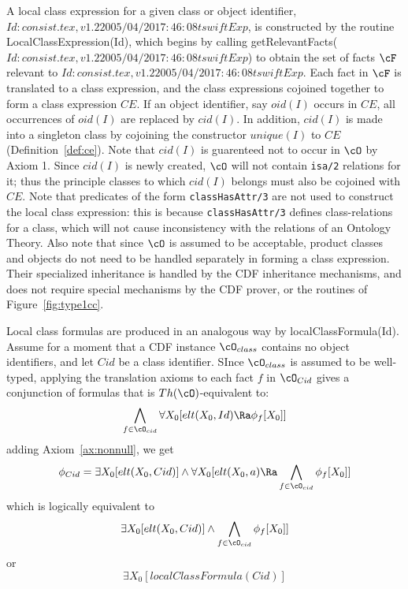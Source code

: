 A local class expression for a given class or object identifier, $Id: consist.tex,v 1.2 2005/04/20 17:46:08 tswift Exp $,
is constructed by the routine {\sf LocalClassExpression(Id)}, which
begins by calling {\sf getRelevantFacts($Id: consist.tex,v 1.2 2005/04/20 17:46:08 tswift Exp $)} to obtain the set of
facts $\cF$ relevant to $Id: consist.tex,v 1.2 2005/04/20 17:46:08 tswift Exp $.  Each fact in $\cF$ is translated to a
class expression, and the class expressions cojoined together to form
a class expression $CE$.  If an object identifier, say $oid(I)$ occurs
in $CE$, all occurrences of $oid(I)$ are replaced by $cid(I)$.  In
addition, $cid(I)$ is made into a singleton class by cojoining the
constructor $unique(I)$ to $CE$ (Definition~\ref{def:ce}).  Note that
$cid(I)$ is guarenteed not to occur in $\cO$ by Axiom 1.  Since
$cid(I)$ is newly created, $\cO$ will not contain {\tt isa/2}
relations for it; thus the principle classes to which $cid(I)$ belongs
must also be cojoined with $CE$.  Note that predicates of the form
{\tt classHasAttr/3} are not used to construct the local class
expression: this is because {\tt classHasAttr/3} defines
class-relations for a class, which will not cause inconsistency with
the relations of an Ontology Theory.  Also note that since $\cO$ is
assumed to be acceptable, product classes and objects do not need to
be handled separately in forming a class expression.  Their
specialized inheritance is handled by the CDF inheritance mechanisms,
and does not require special mechanisms by the CDF prover, or the
routines of Figure~\ref{fig:type1cc}.


Local class formulas are produced in an analogous way by {\sf
localClassFormula(Id)}.  Assume for a moment that a CDF instance
$\cO_{class}$ contains no object identifiers, and let $Cid$ be a class
identifier.  SInce $\cO_{class}$ is assumed to be well-typed, applying
the translation axioms to each fact $f$ in $\cO_{Cid}$ gives a
conjunction of formulas that is $Th(\cO)$-equivalent to:
\[ 
\bigwedge_{f \in \cO_{cid}} \forall X_0 [elt(X_0,Id) \Ra \phi_f[X_0]]
\]
adding Axiom~\ref{ax:nonnull}, we get 
\[ 
\phi_{Cid} = \exists X_0 [elt(X_0,Cid)] \wedge \forall X_0 [elt(X_0,a) \Ra
				\bigwedge_{f \in \cO_{cid}} \phi_f[X_0]] 
\]
which is logically equivalent to 
\[ 
\exists X_0 [elt(X_0,Cid)] \wedge \bigwedge_{f \in \cO_{cid}} \phi_f[X_0]] 
\]
or 
\[ 
\exists X_0 [localClassFormula(Cid)] 
\]

